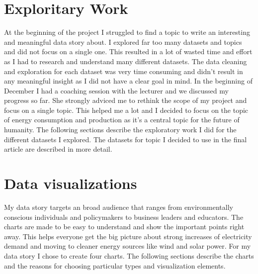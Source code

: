 \documentclass{article}
\begin{document}
\newpage

\section{Exploritary Work}

At the beginning of the project I struggled to find a topic to write an interesting and meaningful data story about.
I explored far too many datasets and topics and did not focus on a single one.
This resulted in a lot of wasted time and effort as I had to research and understand many different datasets.
The data cleaning and exploration for each dataset was very time consuming and didn't result in any meaningful insight as I did not have a clear goal in mind. \newline
In the beginning of December I had a coaching session with the lecturer and we discussed my progress so far.
She strongly adviced me to rethink the scope of my project and focus on a single topic.
This helped me a lot and I decided to focus on the topic of energy consumption and production as it's a central topic for the future of humanity. \newline
The following sections describe the exploratory work I did for the different datasets I explored.
The datasets for topic I decided to use in the final article are described in more detail.

\newpage

\section{Data visualizations}
My data story targets an broad audience that ranges from environmentally conscious individuals and policymakers to business leaders and educators.
The charts are made to be easy to understand and show the important points right away.
This helps everyone get the big picture about strong increases of electricity demand and moving to cleaner energy sources like wind and solar power. \newline
For my data story I chose to create four charts. The following sections describe the charts and the reasons for choosing particular types and visualization elements.
\end{document}
